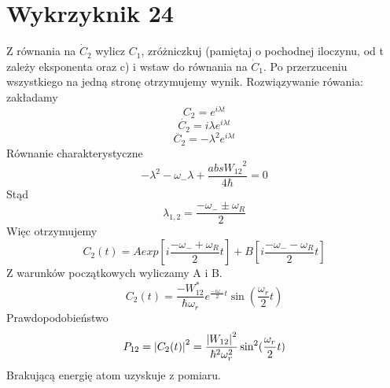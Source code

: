 \documentclass[a4paper,12pt]{article}
\begin{document}
\section{Wykrzyknik 24}
Z równania na $\dot{C}_2$ wylicz $C_1$, zróżniczkuj (pamiętaj o pochodnej
iloczynu, od t zależy eksponenta oraz c) i wstaw do równania na $\dot{C}_1$. Po
przerzuceniu wszystkiego na jedną stronę otrzymujemy wynik. 
Rozwiązywanie rówania:
zakładamy
\begin{equation*}
  C_2 = e^{i\lambda t}
\end{equation*}
\begin{equation*}
  \dot{C_2} = i\lambda e^{i\lambda t}
\end{equation*}
\begin{equation*}
  \ddot{C_2} = -\lambda^2 e^{i\lambda t}
\end{equation*}
Równanie charakterystyczne
\begin{equation*}
  -\lambda^2 - \omega_{-} \lambda + \frac{abs{W_{12}}^2}{4\hbar} = 0
\end{equation*}
Stąd 
\begin{equation*}
  \lambda_{1,2} = \frac{-\omega_{-} \pm \omega_{R}}{2}
\end{equation*}
Więc otrzymujemy
\begin{equation*}
  C_2(t) = A exp\left[ i \frac{-\omega_{-} + \omega_{R}}{2} t\right] + B \left[
  i \frac{-\omega_{-} - \omega_{R}}{2} t\right] 
\end{equation*}
Z warunków początkowych wyliczamy A i B.
\begin{equation*}
  C_2(t) = \frac{-W_{12}^*}{\hbar \omega_r}e^{\frac{-i\omega_{-}}{2}t}
  \sin(\frac{\omega_r}{2}t)
\end{equation*}
Prawdopodobieństwo
\begin{equation*}
  P_{12} = \abs{C_2(t)}^2 = \frac{\abs{W_{12}}^2}{\hbar^2 \omega_r^2}
  \sin^2(\frac{\omega_r}{2}t)
\end{equation*}
Brakującą energię atom uzyskuje z pomiaru.
\end{document}
